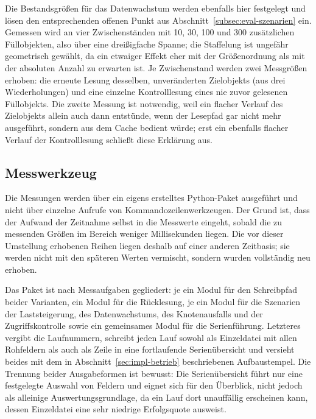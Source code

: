 Die Bestandsgrößen für das Datenwachstum werden ebenfalls hier festgelegt und lösen den entsprechenden offenen Punkt aus Abschnitt~\ref{subsec:eval-szenarien} ein. Gemessen wird an vier Zwischenständen mit 10, 30, 100 und 300 zusätzlichen Füllobjekten, also über eine dreißigfache Spanne; die Staffelung ist ungefähr geometrisch gewählt, da ein etwaiger Effekt eher mit der Größenordnung als mit der absoluten Anzahl zu erwarten ist. Je Zwischenstand werden zwei Messgrößen erhoben: die erneute Lesung desselben, unveränderten Zielobjekts (aus drei Wiederholungen) und eine einzelne Kontrolllesung eines nie zuvor gelesenen Füllobjekts. Die zweite Messung ist notwendig, weil ein flacher Verlauf des Zielobjekts allein auch dann entstünde, wenn der Lesepfad gar nicht mehr ausgeführt, sondern aus dem Cache bedient würde; erst ein ebenfalls flacher Verlauf der Kontrolllesung schließt diese Erklärung aus.

\subsection{Messwerkzeug}
\label{subsec:impl-werkzeug}

Die Messungen werden über ein eigens erstelltes Python-Paket ausgeführt und nicht über einzelne Aufrufe von Kommandozeilenwerkzeugen. Der Grund ist, dass der Aufwand der Zeitnahme selbst in die Messwerte eingeht, sobald die zu messenden Größen im Bereich weniger Millisekunden liegen. Die vor dieser Umstellung erhobenen Reihen liegen deshalb auf einer anderen Zeitbasis; sie werden nicht mit den späteren Werten vermischt, sondern wurden vollständig neu erhoben.

Das Paket ist nach Messaufgaben gegliedert: je ein Modul für den Schreibpfad beider Varianten, ein Modul für die Rücklesung, je ein Modul für die Szenarien der Laststeigerung, des Datenwachstums, des Knotenausfalls und der Zugriffskontrolle sowie ein gemeinsames Modul für die Serienführung. Letzteres vergibt die Laufnummern, schreibt jeden Lauf sowohl als Einzeldatei mit allen Rohfeldern als auch als Zeile in eine fortlaufende Serienübersicht und versieht beides mit dem in Abschnitt~\ref{sec:impl-betrieb} beschriebenen Aufbaustempel. Die Trennung beider Ausgabeformen ist bewusst: Die Serienübersicht führt nur eine festgelegte Auswahl von Feldern und eignet sich für den Überblick, nicht jedoch als alleinige Auswertungsgrundlage, da ein Lauf dort unauffällig erscheinen kann, dessen Einzeldatei eine sehr niedrige Erfolgsquote ausweist.

